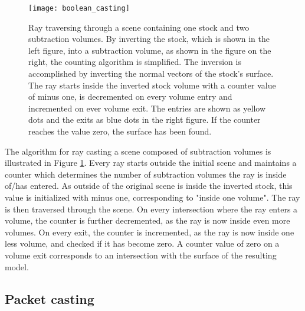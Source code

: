 \begin{figure}
\centering
\texttt{[image: boolean\_casting]}
\caption{Ray traversing through a scene containing one stock and two subtraction volumes. By inverting the stock, which is shown in the left figure, into a subtraction volume, as shown in the figure on the right, the counting algorithm is simplified. The inversion is accomplished by inverting the normal vectors of the stock's surface. The ray starts inside the inverted stock volume with a counter value of minus one, is decremented on every volume entry and incremented on ever volume exit. The entries are shown as yellow dots and the exits as blue dots in the right figure. If the counter reaches the value zero, the surface has been found.}
\label{fig:boolean_casting} 
\end{figure}

The algorithm for ray casting a scene composed of subtraction volumes is illustrated in Figure \ref{fig:boolean_casting}. Every ray starts outside the initial scene and maintains a counter which determines the number of subtraction volumes the ray is inside of/has entered. As outside of the original scene is inside the inverted stock, this value is initialized with minus one, corresponding to "inside one volume". The ray is then traversed through the scene. On every intersection where the ray enters a volume, the counter is further decremented, as the ray is now inside even more volumes. On every exit, the counter is incremented, as the ray is now inside one less volume, and checked if it has become zero. A counter value of zero on a volume exit corresponds to an intersection with the surface of the resulting model.

\subsection{Packet casting}
\label{sec:packet_casting}


